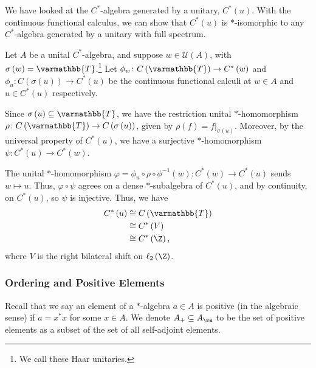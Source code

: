 \documentclass[10pt]{mypackage}
\renewcommand*{\mathbb}[1]{\varmathbb{#1}}
\newcommand{\T}{\mathbb{T}}
\begin{document}
\begin{example}
  We have looked at the $C^{\ast}$-algebra generated by a unitary, $C^{\ast}\left(u\right)$. With the continuous functional calculus, we can show that $C^{\ast}\left(u\right)$ is $\ast$-isomorphic to any $C^{\ast}$-algebra generated by a unitary with full spectrum.\newline

  Let $A$ be a unital $C^{\ast}$-algebra, and suppose $w\in \mathcal{U}\left(A\right)$, with $\sigma\left(w\right) = \T$.\footnote{We call these Haar unitaries.} Let $\phi_w\colon C\left(\T\right)\rightarrow C^{\ast}\left(w\right)$ and $\phi_u\colon C\left(\sigma\left(u\right)\right)\rightarrow C^{\ast}\left(u\right)$ be the continuous functional calculi at $w\in A$ and $u\in C^{\ast}\left(u\right)$ respectively.\newline

  Since $\sigma\left(u\right)\subseteq \T$, we have the restriction unital $\ast$-homomorphism $\rho\colon C\left(\T\right)\rightarrow C\left(\sigma\left(u\right)\right)$, given by $\rho\left(f\right) = f|_{\sigma\left(u\right)}$. Moreover, by the universal property of $C^{\ast}\left(u\right)$, we have a surjective $\ast$-homomorphism $\psi\colon C^{\ast}\left(u\right)\rightarrow C^{\ast}\left(w\right)$.\newline

  The unital $\ast$-homomorphism $\varphi = \phi_u\circ \rho \circ \phi^{-1}(w)\colon C^{\ast}\left(w\right)\rightarrow C^{\ast}\left(u\right)$ sends $w\mapsto u$. Thus, $\varphi\circ \psi$ agrees on a dense $\ast$-subalgebra of $C^{\ast}\left(u\right)$, and by continuity, on $C^{\ast}\left(u\right)$, so $\psi$ is injective. Thus, we have
  \begin{align*}
    C^{\ast}\left(u\right) &\cong C\left(\T\right)\\
                           &\cong C^{\ast}\left(V\right)\\
                           &\cong C^{\ast}\left(\Z\right),
  \end{align*}
  where $V$ is the right bilateral shift on $\ell_{2}\left(\Z\right)$.
\end{example}
\subsubsection{Ordering and Positive Elements}%
Recall that we say an element of a $\ast$-algebra $a\in A$ is positive (in the algebraic sense) if $a = x^{\ast}x$ for some $x\in A$. We denote $A_{+}\subseteq A_{\sa}$ to be the set of positive elements as a subset of the set of all self-adjoint elements.\newline
\end{document}
